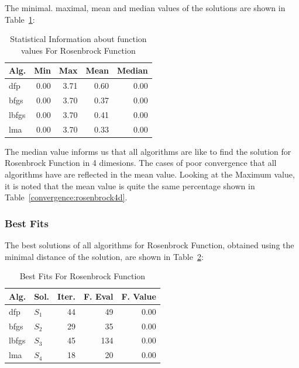 \documentclass[conference]{IEEEtran}
\begin{document}
The minimal. maximal, mean and median values of the solutions are shown in Table~\ref{function_values:rosenbrock4d}:

\begin{table}[H]
\centering
\caption{Statistical Information about function values For Rosenbrock Function}
\label{function_values:rosenbrock4d}
\begin{tabular}{lrrrr}
\toprule
 Alg. &  Min &  Max &  Mean &  Median \\
\midrule
  dfp & 0.00 & 3.71 &  0.60 &    0.00 \\
 bfgs & 0.00 & 3.70 &  0.37 &    0.00 \\
lbfgs & 0.00 & 3.70 &  0.41 &    0.00 \\
  lma & 0.00 & 3.70 &  0.33 &    0.00 \\
\bottomrule
\end{tabular}
\end{table}


The median value informs us that all algorithms are like to find the solution
for Rosenbrock Function in 4 dimesions. The cases of poor convergence that all algorithms
have are reflected in the mean value. Looking at the Maximum value, it is noted that the mean value is
quite the same percentage shown in Table~\ref{convergence:rosenbrock4d}.

\subsubsection{Best Fits}
\label{bestfitsrosenbrock4d4D}


The best solutions of all algorithms for Rosenbrock Function, obtained using the minimal
distance of the solution, are shown in Table~\ref{solutions:rosenbrock4d}:

\begin{table}[H]
\centering
\caption{Best Fits For Rosenbrock Function}
\label{solutions:rosenbrock4d}
\begin{tabular}{llrrr}
\toprule
 Alg. &    Sol. &  Iter. &  F. Eval &  F. Value \\
\midrule
  dfp & $S_{1}$ &     44 &       49 &      0.00 \\
 bfgs & $S_{2}$ &     29 &       35 &      0.00 \\
lbfgs & $S_{3}$ &     45 &      134 &      0.00 \\
  lma & $S_{4}$ &     18 &       20 &      0.00 \\
\bottomrule
\end{tabular}
\end{table}
\end{document}
